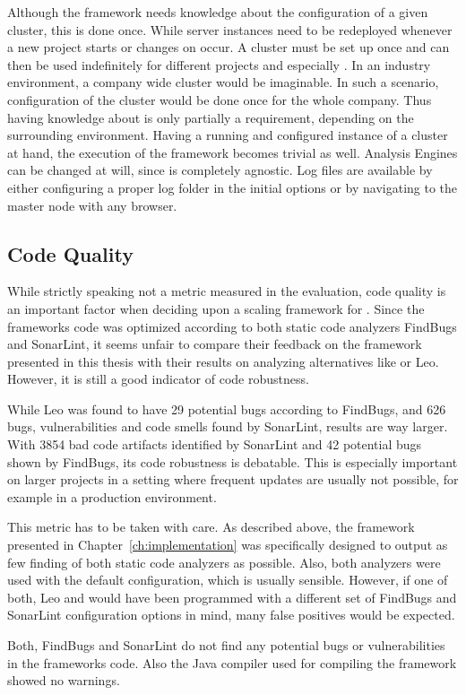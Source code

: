 Although the framework needs knowledge about the configuration of a given \spark{} cluster, this is done once. While \uimaas{} server instances need to be redeployed whenever a new project starts or changes on \anens{} occur. A \spark{} cluster must be set up once and can then be used indefinitely for different projects and especially \anens{}. In an industry environment, a company wide \spark{} cluster would be imaginable. In such a scenario, configuration of the \spark{} cluster would be done once for the whole company. Thus having knowledge about \spark{} is only partially a requirement, depending on the surrounding environment. Having a running and configured instance of a \spark{} cluster at hand, the execution of the framework becomes trivial as well. Analysis Engines can be changed at will, since \spark{} is completely \uima{} agnostic. Log files are available by either configuring a proper log folder in the initial \spark{} options or by navigating to the \spark{} master node with any browser.
\subsection{Code Quality}
While strictly speaking not a metric measured in the evaluation, code quality is an important factor when deciding upon a scaling framework for \uima{}. Since the frameworks code was optimized according to both static code analyzers FindBugs and SonarLint, it seems unfair to compare their feedback on the framework presented in this thesis with their results on analyzing alternatives like \uimaas{} or Leo. However, it is still a good indicator of code robustness.

While Leo was found to have 29 potential bugs according to FindBugs, and 626 bugs, vulnerabilities and code smells found by SonarLint, \uimaas{} results are way larger. With 3854 bad code artifacts identified by SonarLint and 42 potential bugs shown by FindBugs, its code robustness is debatable. This is especially important on larger projects in a setting where frequent updates are usually not possible, for example in a production environment.

This metric has to be taken with care. As described above, the framework presented in Chapter~\ref{ch:implementation} was specifically designed to output as few finding of both static code analyzers as possible. Also, both analyzers were used with the default configuration, which is usually sensible. However, if one of both, Leo and \uimaas{} would have been programmed with a different set of FindBugs and SonarLint configuration options in mind, many false positives would be expected.

Both, FindBugs and SonarLint do not find any potential bugs or vulnerabilities in the frameworks code. Also the Java compiler used for compiling the framework showed no warnings.

